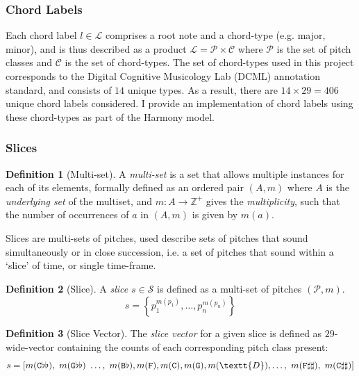 \documentclass[12pt,a4paper,twoside,openany]{report} \usepackage[pdfborder={0 0 0}]{hyperref}    %
\theoremstyle{definition} \newtheorem{definition}{Definition}[section]
\begin{document}
\subsubsection{Chord Labels}
\label{sub:chordTypes}

Each chord label $l \in \mathcal{L}$ comprises a root note and a chord-type (e.g. major, minor), and is thus described
as a product $\mathcal{L} = \mathcal{P} \times \mathcal{C}$ where $\mathcal{P}$ is the set of pitch classes and $\mathcal{C}$ is the set of chord-types. 
The set of chord-types used in this project corresponds to the Digital Cognitive Musicology Lab (DCML)
annotation standard, and consists of $14$ unique types. As a result, there are $14 \times 29 = 406$ unique chord labels
considered. I provide an implementation of chord labels using these
chord-types as part of the Harmony model.

\subsubsection{Slices}
\label{sub:slices}

\begin{definition}[Multi-set] A \textit{multi-set} is a set that allows multiple instances for each of its elements,
formally defined as an ordered pair $(A,m)$ where $A$ is the \textit{underlying set} of the multiset, and $m:A \to
\mathbb{Z}^+$ gives the \textit{multiplicity}, such that the number of occurrences of $a$ in $(A,m)$ is given by $m(a)$.
\end{definition}

Slices are multi-sets of pitches, used describe sets of pitches that sound simultaneously or in close succession, i.e. a set of pitches that sound within a `slice' of time, or single time-frame. 

\begin{definition}[Slice] 
  A \textit{slice} $s \in \mathcal{S}$ is defined as a multi-set of pitches $(\mathcal{P}, m)$. 
  \begin{equation} s = \left\{ p_1^{m(p_1)} , \dots, p_n^{m(p_n)} \right\}
  \label{eq:sliceDef} \end{equation}
\end{definition}

\begin{definition}[Slice Vector] 
  The \textit{slice vector} for a given slice is defined as $29$-wide-vector containing the counts of each corresponding pitch class present:
  \begin{equation} s = \left[ m(\texttt{C}\flat\flat) ,~m(\texttt{G}\flat\flat)~\dots,~m(\texttt{B}\flat),m(\texttt{F}),
    m(\texttt{C}), m(\texttt{G}), m(\textt{D}),\dots,~m(\texttt{F}\sharp\sharp),~m(\texttt{C}\sharp\sharp) \right]
  \label{eq:sliceVec} \end{equation}
\end{definition}
\end{document}
